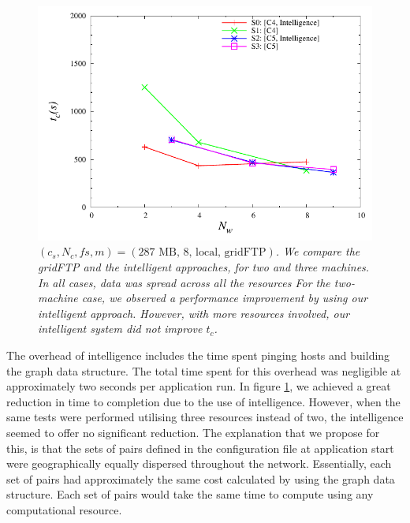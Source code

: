 \documentclass{rspublic}
\newcommand{\micnote}[1]{ {\textcolor{blue} { ***Michael: #1 }}}
\newcommand{\betynote}[1]{ {\textcolor{orange} { ***Bety: #1 }}}
\newcommand{\jhanote}[1]{} \newcommand{\micnote}[1]{}\newcommand{\betynote}[1]{} \newcommand{\fixme}[1]{}
\begin{document}
\begin{figure}[!ht]
\begin{center}
   \includegraphics[scale=0.5] {data/graphs/IntelligentFigure}
\end{center}
\caption{\textit{$(c_s, N_c, fs, m)=(\mbox{287 MB, 8, local, gridFTP})$.
We compare the gridFTP and the intelligent approaches, for two and three
machines. In all cases, data was spread across all the resources For
the two-machine case, we observed a performance improvement by using our
intelligent approach. However, with more resources involved, our
intelligent system did not improve $t_c$.}}
\label{Fig:IntelligentExp}
\end{figure}


The overhead of intelligence includes the time spent pinging hosts and
building the graph data structure. The total time spent for this
overhead was negligible at approximately two seconds per application
run. In figure \ref{Fig:IntelligentExp}, we achieved a great reduction
in time to completion due to the use of intelligence. However, when the
same tests were performed utilising three resources instead of two, the
intelligence seemed to offer no significant reduction. The explanation
that we propose for this, is that the sets of pairs defined in the
configuration file at application start were geographically equally
dispersed throughout the network. Essentially, each set of pairs had
approximately the same cost calculated by using the graph data
structure. Each set of pairs would take the same time to compute using
any computational resource. %
\end{document}
